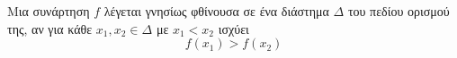 Μια συνάρτηση $ f $ λέγεται γνησίως φθίνουσα σε ένα διάστημα $ \varDelta $ του πεδίου ορισμού της, αν για κάθε $ x_1,x_2\in\varDelta $ με $ x_1<x_2 $ ισχύει
\[ f(x_1)>f(x_2) \]
